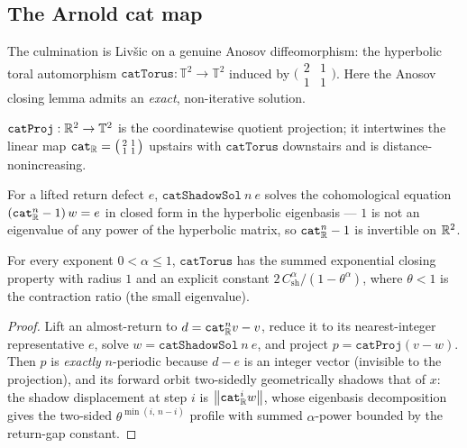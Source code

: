 \subsection{The Arnold cat map}

The culmination is Livšic on a genuine Anosov diffeomorphism: the hyperbolic toral automorphism
\(\texttt{catTorus}:\mathbb{T}^2\to\mathbb{T}^2\) induced by \(\bigl(\begin{smallmatrix}2&1\\1&1\end{smallmatrix}\bigr)\).
Here the Anosov closing lemma admits an \emph{exact}, non-iterative solution.

\begin{definition}\label{def:livsic-catproj}
  \leanok
  \(\texttt{catProj}:\mathbb{R}^2\to\mathbb{T}^2\) is the coordinatewise quotient projection; it intertwines the
  linear map \(\texttt{cat}_{\mathbb{R}} = \bigl(\begin{smallmatrix}2&1\\1&1\end{smallmatrix}\bigr)\)
  upstairs with \(\texttt{catTorus}\) downstairs and is distance-nonincreasing.
\end{definition}

\begin{definition}\label{def:livsic-catshadow}
  \leanok
  For a lifted return defect \(e\), \(\texttt{catShadowSol}\ n\ e\) solves the cohomological
  equation \((\texttt{cat}_{\mathbb{R}}^n - 1)\,w = e\) in closed form in the hyperbolic eigenbasis --- \(1\)
  is not an eigenvalue of any power of the hyperbolic matrix, so \(\texttt{cat}_{\mathbb{R}}^n - 1\) is
  invertible on \(\mathbb{R}^2\).
\end{definition}

\begin{theorem}\label{thm:livsic-cat-closing}
  \leanok
  For every exponent \(0 < \alpha\le 1\), \(\texttt{catTorus}\) has the summed exponential closing
  property with radius \(1\) and an explicit constant \(2\,C_{\mathrm{sh}}^{\alpha}/(1-\theta^{\alpha})\),
  where \(\theta<1\) is the contraction ratio (the small eigenvalue).
\end{theorem}
\begin{proof}\leanok
  Lift an almost-return to \(d = \texttt{cat}_{\mathbb{R}}^n v - v\), reduce it to its nearest-integer
  representative \(e\), solve \(w = \texttt{catShadowSol}\ n\ e\), and project
  \(p = \texttt{catProj}(v - w)\). Then \(p\) is \emph{exactly} \(n\)-periodic because \(d - e\) is an
  integer vector (invisible to the projection), and its forward orbit two-sidedly geometrically
  shadows that of \(x\): the shadow displacement at step \(i\) is \(\left\lVert \texttt{cat}_{\mathbb{R}}^i w \right\rVert\),
  whose eigenbasis decomposition gives the two-sided \(\theta^{\min(i,\,n-i)}\) profile with summed
  \(\alpha\)-power bounded by the return-gap constant.
\end{proof}

